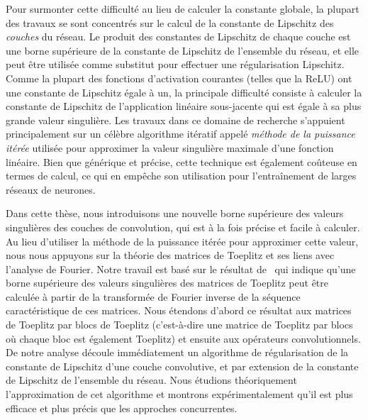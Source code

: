 Pour surmonter cette difficulté au lieu de calculer la constante globale, la plupart des travaux se sont concentrés sur le calcul de la constante de Lipschitz des \emph{couches} du réseau.
Le produit des constantes de Lipschitz de chaque couche est une borne supérieure de la constante de Lipschitz de l'ensemble du réseau, et elle peut être utilisée comme substitut pour effectuer une régularisation Lipschitz.
Comme la plupart des fonctions d'activation courantes (telles que la ReLU) ont une constante de Lipschitz égale à un, la principale difficulté consiste à calculer la constante de Lipschitz de l'application linéaire sous-jacente qui est égale à sa plus grande valeur singulière.
Les travaux dans ce domaine de recherche s'appuient principalement sur un célèbre algorithme itératif appelé \emph{méthode de la puissance itérée} \cite{golub2000eigenvalue} utilisée pour approximer la valeur singulière maximale d'une fonction linéaire.
Bien que générique et précise, cette technique est également coûteuse en termes de calcul, ce qui en empêche son utilisation pour l'entraînement de larges réseaux de neurones. 

Dans cette thèse, nous introduisons une nouvelle borne supérieure des valeurs singulières des couches de convolution, qui est à la fois précise et facile à calculer.
Au lieu d'utiliser la méthode de la puissance itérée pour approximer cette valeur, nous nous appuyons sur la théorie des matrices de Toeplitz et ses liens avec l'analyse de Fourier.
Notre travail est basé sur le résultat de~\citet{gray2006toeplitz} qui indique qu'une borne supérieure des valeurs singulières des matrices de Toeplitz peut être calculée à partir de la transformée de Fourier inverse de la séquence caractéristique de ces matrices.
Nous étendons d'abord ce résultat aux matrices de Toeplitz par blocs de Toeplitz (c'est-à-dire une matrice de Toeplitz par blocs où chaque bloc est également Toeplitz) et ensuite aux opérateurs convolutionnels.
De notre analyse découle immédiatement un algorithme de régularisation de la constante de Lipschitz d'une couche convolutive, et par extension de la constante de Lipschitz de l'ensemble du réseau.
Nous étudions théoriquement l'approximation de cet algorithme et montrons expérimentalement qu'il est plus efficace et plus précis que les approches concurrentes.

